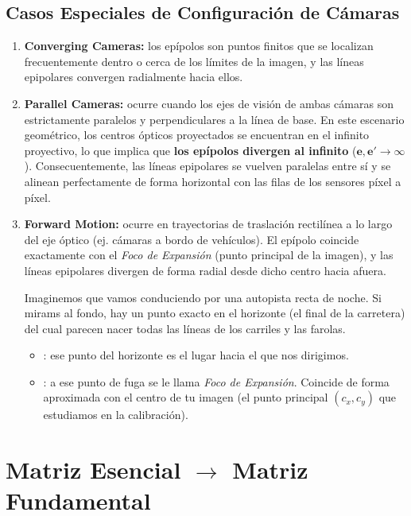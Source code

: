 \subsection{Casos Especiales de Configuración de Cámaras}
\begin{enumerate}
    \item \textbf{Converging Cameras:} los epípolos son puntos finitos que se localizan frecuentemente dentro o cerca de los límites de la imagen, y las líneas epipolares convergen radialmente hacia ellos.
    \item \textbf{Parallel Cameras:} ocurre cuando los ejes de visión de ambas cámaras son estrictamente paralelos y perpendiculares a la línea de base. En este escenario geométrico, los centros ópticos proyectados se encuentran en el infinito proyectivo, lo que implica que \textbf{los epípolos divergen al infinito} ($\mathbf{e}, \mathbf{e}' \to \infty$). Consecuentemente, las líneas epipolares se vuelven paralelas entre sí y se alinean perfectamente de forma horizontal con las filas de los sensores píxel a píxel.
    \item \textbf{Forward Motion:} ocurre en trayectorias de traslación rectilínea a lo largo del eje óptico (ej. cámaras a bordo de vehículos). El epípolo coincide exactamente con el \textit{Foco de Expansión} (punto principal de la imagen), y las líneas epipolares divergen de forma radial desde dicho centro hacia afuera. 
    
    \begin{ejemplo}
        Imaginemos que vamos conduciendo por una autopista recta de noche. Si mirams al fondo, hay un punto exacto en el horizonte (el final de la carretera) del cual parecen nacer todas las líneas de los carriles y las farolas.
        \begin{itemize}
            \item {}: ese punto del horizonte es el lugar hacia el que nos dirigimos.
            \item {}: a ese punto de fuga se le llama \textit{Foco de Expansión}. Coincide de forma aproximada con el centro de tu imagen (el punto principal $(c_x, c_y)$ que estudiamos en la calibración).
        \end{itemize} 
    \end{ejemplo}
    
\end{enumerate}

\section{Matriz Esencial $\to$ Matriz Fundamental}

